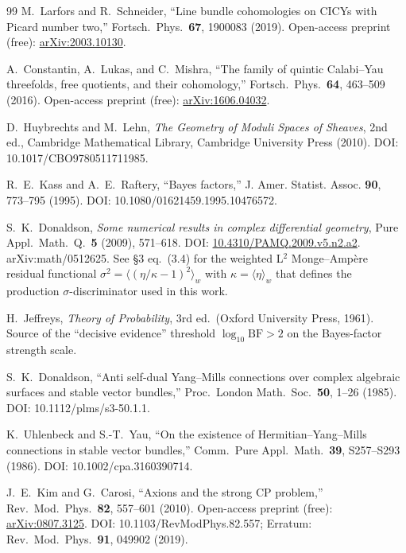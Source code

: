 ﻿\documentclass[reprint,amsmath,amssymb,aps,prd,longbibliography,floatfix]{revtex4-2}
\begin{document}
\begin{thebibliography}{99}
 M.~Larfors and R.~Schneider,
``Line bundle cohomologies on CICYs with Picard number two,''
Fortsch.\ Phys.\ \textbf{67}, 1900083 (2019).
Open-access preprint (free): \href{https://arxiv.org/abs/2003.10130}{arXiv:2003.10130}.

 A.~Constantin, A.~Lukas, and C.~Mishra,
``The family of quintic Calabi--Yau threefolds, free quotients, and their cohomology,''
Fortsch.\ Phys.\ \textbf{64}, 463--509 (2016).
Open-access preprint (free): \href{https://arxiv.org/abs/1606.04032}{arXiv:1606.04032}.

 D.~Huybrechts and M.~Lehn,
\emph{The Geometry of Moduli Spaces of Sheaves}, 2nd ed.,
Cambridge Mathematical Library, Cambridge University Press (2010).
DOI: 10.1017/CBO9780511711985.

 R.~E.~Kass and A.~E.~Raftery,
``Bayes factors,''
J. Amer. Statist. Assoc. \textbf{90}, 773--795 (1995).
DOI: 10.1080/01621459.1995.10476572.

 S.~K.~Donaldson,
\emph{Some numerical results in complex differential geometry},
Pure Appl.\ Math.\ Q.\ \textbf{5} (2009), 571--618.
DOI: \href{https://doi.org/10.4310/PAMQ.2009.v5.n2.a2}{10.4310/PAMQ.2009.v5.n2.a2}.
arXiv:math/0512625.
See §3 eq.~(3.4) for the weighted L$^2$ Monge--Ampère residual functional
$\sigma^2 = \langle (\eta/\kappa - 1)^2 \rangle_{w}$ with $\kappa = \langle \eta \rangle_{w}$
that defines the production $\sigma$-discriminator used in this work.

 H.~Jeffreys,
\emph{Theory of Probability}, 3rd ed.\
(Oxford University Press, 1961).
Source of the ``decisive evidence'' threshold $\log_{10} \mathrm{BF} > 2$ on the Bayes-factor strength scale.

 S.~K.~Donaldson,
``Anti self-dual Yang--Mills connections over complex algebraic surfaces and stable vector bundles,''
Proc.\ London Math.\ Soc.\ \textbf{50}, 1--26 (1985).
DOI: 10.1112/plms/s3-50.1.1.

 K.~Uhlenbeck and S.-T.~Yau,
``On the existence of Hermitian--Yang--Mills connections in stable vector bundles,''
Comm.\ Pure Appl.\ Math.\ \textbf{39}, S257--S293 (1986).
DOI: 10.1002/cpa.3160390714.

 J.~E.~Kim and G.~Carosi,
``Axions and the strong CP problem,''
Rev.\ Mod.\ Phys.\ \textbf{82}, 557--601 (2010).
Open-access preprint (free): \href{https://arxiv.org/abs/0807.3125}{arXiv:0807.3125}.
DOI: 10.1103/RevModPhys.82.557;
Erratum: Rev.\ Mod.\ Phys.\ \textbf{91}, 049902 (2019).


\end{thebibliography}
\end{document}
